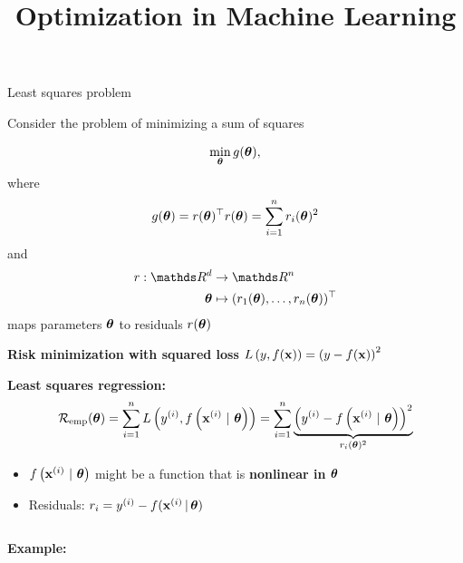 \documentclass[11pt,compress,t,notes=noshow, xcolor=table]{beamer}
\title{Optimization in Machine Learning}
\date{}
\begin{document}
\sloppy

\begin{vbframe}{Least squares problem}

Consider the problem of minimizing a sum of squares

\begin{equation*}
	\min_{\bm{\theta}} g(\bm{\theta}),
\end{equation*}
where
\begin{equation*}
    g(\bm{\theta}) = r(\bm{\theta})^\top r(\bm{\theta}) = \sum_{i = 1}^n r_i(\bm{\theta})^2
\end{equation*}
and
\begin{align*}
	r: \R^d &\to \R^n \\
	\thetab &\mapsto (r_1(\thetab), \ldots, r_n(\thetab))^\top
\end{align*}
maps parameters $\bm{\theta}$ to residuals $r(\bm{\theta})$

\framebreak 

\textbf{Risk minimization with squared loss} $L\left(y, f(\mathbf{x})\right) = \left(y - f(\mathbf{x})\right)^2$

\medskip

\textbf{Least squares regression:}
\begin{equation*}
    \mathcal{R}_{\text{emp}}(\bm{\theta}) = \sum\limits_{i=1}^n L\left(y^{(i)}, f\left(\mathbf{x}^{(i)} ~|~ \bm{\theta}\right)\right) = \sum\limits_{i=1}^n \underbrace{\left(y^{(i)} - f\left(\mathbf{x}^{(i)} ~|~ \bm{\theta}\right) \right)^2}_{r_i(\bm{\theta})^2}
\end{equation*}

\begin{itemize}
    \item $f\left(\mathbf{x}^{(i)} ~|~ \bm{\theta}\right)$ might be a function that is \textbf{nonlinear in $\bm{\theta}$}
    \item Residuals: $r_i = y^{(i)} - f(\mathbf{x}^{(i)} \,|\, \bm{\theta})$
\end{itemize}

\vspace*{0.3cm} 

\begin{columns}
\begin{column}{0.55\textwidth}
\textbf{Example:} 


\end{column}
\end{columns}
\end{vbframe}
\end{document}
